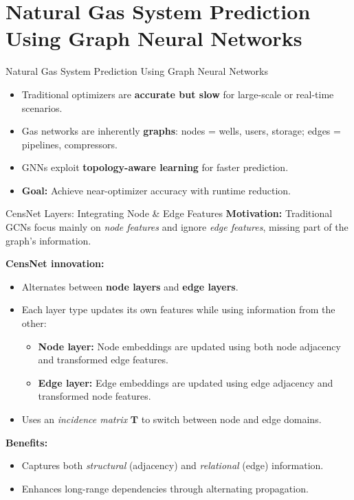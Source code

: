 \documentclass[hyperref={colorlinks,citecolor=blue,linkcolor=blue,urlcolor=blue}]{beamer}
\begin{document}
\section{Natural Gas System Prediction Using Graph Neural Networks}

\begin{frame}{Natural Gas System Prediction Using Graph Neural Networks}
    \begin{itemize}
        \item Traditional optimizers are \textbf{accurate but slow} for large-scale or real-time scenarios.
        \item Gas networks are inherently \textbf{graphs}: nodes = wells, users, storage; edges = pipelines, compressors.
        \item GNNs exploit \textbf{topology-aware learning} for faster prediction.
        \item \textbf{Goal:} Achieve near-optimizer accuracy with runtime reduction.
    \end{itemize} 
\end{frame}


\begin{frame}{CensNet Layers: Integrating Node \& Edge Features}
\footnotesize
\textbf{Motivation:}  
Traditional GCNs focus mainly on \textit{node features} and ignore \textit{edge features}, missing part of the graph’s information.

\medskip
\textbf{CensNet innovation:}
\begin{itemize}
    \item Alternates between \textbf{node layers} and \textbf{edge layers}.
    \item Each layer type updates its own features while using information from the other:
    \begin{itemize}
        \item \textbf{Node layer:} Node embeddings are updated using both node adjacency and transformed edge features.
        \item \textbf{Edge layer:} Edge embeddings are updated using edge adjacency and transformed node features.
    \end{itemize}
    \item Uses an \textit{incidence matrix} \( \mathbf{T} \) to switch between node and edge domains.
\end{itemize}

\medskip
\textbf{Benefits:}
\begin{itemize}
    \item Captures both \textit{structural} (adjacency) and \textit{relational} (edge) information.
    \item Enhances long-range dependencies through alternating propagation.
\end{itemize}
\end{frame}
\end{document}

